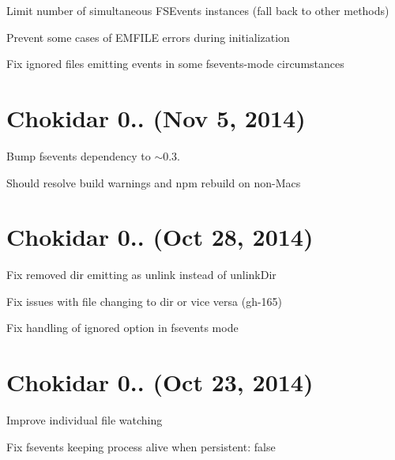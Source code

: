 \begin{DoxyItemize}
\item Limit number of simultaneous F\+S\+Events instances (fall back to other methods)
\item Prevent some cases of E\+M\+F\+I\+LE errors during initialization
\item Fix ignored files emitting events in some fsevents-\/mode circumstances
\end{DoxyItemize}

\section*{Chokidar 0.. (Nov 5, 2014)}


\begin{DoxyItemize}
\item Bump fsevents dependency to $\sim$0.3.
\begin{DoxyItemize}
\item Should resolve build warnings and {\ttfamily npm rebuild} on non-\/\+Macs
\end{DoxyItemize}
\end{DoxyItemize}

\section*{Chokidar 0.. (Oct 28, 2014)}


\begin{DoxyItemize}
\item Fix removed dir emitting as {\ttfamily unlink} instead of {\ttfamily unlink\+Dir}
\item Fix issues with file changing to dir or vice versa (gh-\/165)
\item Fix handling of {\ttfamily ignored} option in fsevents mode
\end{DoxyItemize}

\section*{Chokidar 0.. (Oct 23, 2014)}


\begin{DoxyItemize}
\item Improve individual file watching
\item Fix fsevents keeping process alive when {\ttfamily persistent\+: false}
\end{DoxyItemize}

